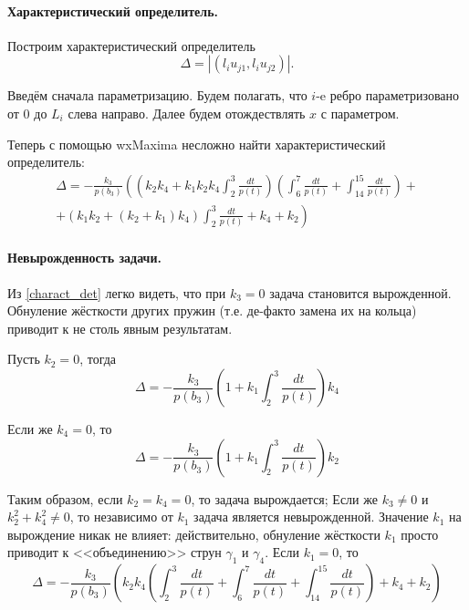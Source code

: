 \documentclass[a4paper,12pt]{article} %
\begin{document}
\paragraph{Характеристический определитель.}
Построим характеристический определитель
\begin{equation}
	\Delta = | (l_i u_{j1}, l_i u_{j2})|.
\end{equation}

Введём сначала параметризацию.
Будем полагать, что $i$-e ребро параметризовано от 0 до $L_i$ слева направо.
Далее будем отождествлять $x$ с параметром.



Теперь с помощью wxMaxima несложно найти характеристический определитель:
\begin{multline}\label{charact_det}
	\Delta =
	-\frac{k_3}{p(b_3)}
	\left(
		\left( k_2 k_4+k_1 k_2 k_4 \int_{2}^{3}\frac{dt}{p(t)}\right)  \left( \int_{6}^{7}\frac{dt}{p(t)}+\int_{14}^{15}\frac{dt}{p(t)}\right)
		\right. +\\+ \left.
		\left( k_1 k_2+\left( k_2+k_1\right)  k_4\right)  \int_{2}^{3}\frac{dt}{p(t)}+k_4+k_2
	\right)
\end{multline}

\paragraph{Невырожденность задачи.}
Из \eqref{charact_det} легко видеть,
что при $k_3 = 0$ задача становится вырожденной.
Обнуление жёсткости других пружин (т.е. де-факто замена их на кольца)
приводит к не столь явным результатам.

Пусть $k_2 = 0$, тогда
\begin{equation}
	\Delta = - \frac{k_3}{p(b_3)} \left( 1+k_1 \int_{2}^{3}\frac{dt}{p(t)} \right)  k_4
\end{equation}

Если же $k_4 = 0$, то
\begin{equation}
	\Delta = - \frac{k_3}{p(b_3)} \left( 1+k_1 \int_{2}^{3}\frac{dt}{p(t)} \right)  k_2
\end{equation}

Таким образом, если $k_2 = k_4 = 0$, то задача вырождается;
Если же $k_3 \neq 0$ и $k_2^2+k_4^2 \neq 0$, то независимо от $k_1$ задача является невырожденной.
Значение $k_1$ на вырождение никак не влияет:
действительно, обнуление жёсткости $k_1$ просто приводит к <<объединению>> струн $\gamma_1$ и $\gamma_4$.
Если $k_1=0$, то
\begin{equation}
	\Delta = - \frac{k_3}{p(b_3)} \left(
		k_2 k_4 \left( \int_{2}^{3}\frac{dt}{p(t)}+\int_{6}^{7}\frac{dt}{p(t)}+\int_{14}^{15}\frac{dt}{p(t)}\right) +k_4+k_2
	\right)
\end{equation}
\end{document}
